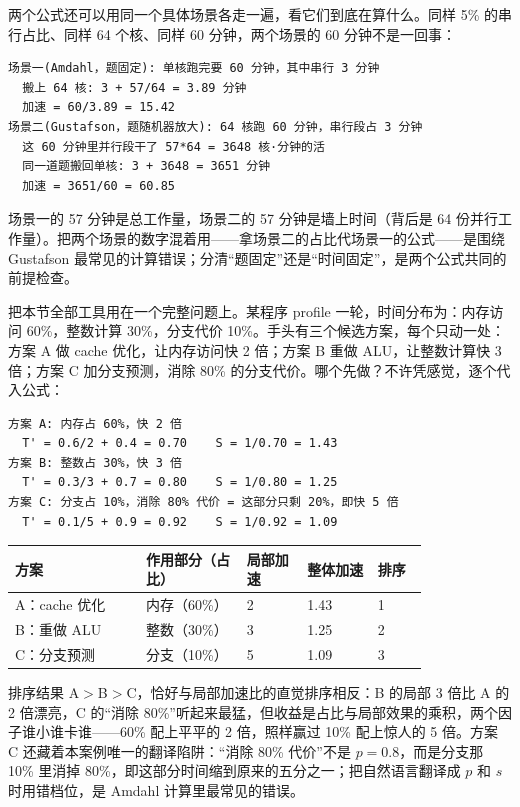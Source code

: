 两个公式还可以用同一个具体场景各走一遍，看它们到底在算什么。同样 5\% 的串行占比、同样 64 个核、同样 60 分钟，两个场景的 60 分钟不是一回事：

\begin{lstlisting}
场景一(Amdahl，题固定): 单核跑完要 60 分钟，其中串行 3 分钟
  搬上 64 核: 3 + 57/64 = 3.89 分钟
  加速 = 60/3.89 = 15.42
场景二(Gustafson，题随机器放大): 64 核跑 60 分钟，串行段占 3 分钟
  这 60 分钟里并行段干了 57*64 = 3648 核·分钟的活
  同一道题搬回单核: 3 + 3648 = 3651 分钟
  加速 = 3651/60 = 60.85
\end{lstlisting}

场景一的 57 分钟是总工作量，场景二的 57 分钟是墙上时间（背后是 64 份并行工作量）。把两个场景的数字混着用——拿场景二的占比代场景一的公式——是围绕 Gustafson 最常见的计算错误；分清“题固定”还是“时间固定”，是两个公式共同的前提检查。

把本节全部工具用在一个完整问题上。某程序 profile 一轮，时间分布为：内存访问 60\%，整数计算 30\%，分支代价 10\%。手头有三个候选方案，每个只动一处：方案 A 做 cache 优化，让内存访问快 2 倍；方案 B 重做 ALU，让整数计算快 3 倍；方案 C 加分支预测，消除 80\% 的分支代价。哪个先做？不许凭感觉，逐个代入公式：

\begin{lstlisting}
方案 A: 内存占 60%，快 2 倍
  T' = 0.6/2 + 0.4 = 0.70    S = 1/0.70 = 1.43
方案 B: 整数占 30%，快 3 倍
  T' = 0.3/3 + 0.7 = 0.80    S = 1/0.80 = 1.25
方案 C: 分支占 10%，消除 80% 代价 = 这部分只剩 20%，即快 5 倍
  T' = 0.1/5 + 0.9 = 0.92    S = 1/0.92 = 1.09
\end{lstlisting}

\begin{longtable}{L{0.26\linewidth}L{0.20\linewidth}L{0.12\linewidth}L{0.14\linewidth}L{0.10\linewidth}}
\toprule
方案 & 作用部分（占比） & 局部加速 & 整体加速 & 排序 \\
\midrule
A：cache 优化 & 内存（60\%） & 2 & 1.43 & 1 \\\tablerowrule
B：重做 ALU & 整数（30\%） & 3 & 1.25 & 2 \\\tablerowrule
C：分支预测 & 分支（10\%） & 5 & 1.09 & 3 \\
\bottomrule
\end{longtable}

排序结果 A$>$B$>$C，恰好与局部加速比的直觉排序相反：B 的局部 3 倍比 A 的 2 倍漂亮，C 的“消除 80\%”听起来最猛，但收益是占比与局部效果的乘积，两个因子谁小谁卡谁——60\% 配上平平的 2 倍，照样赢过 10\% 配上惊人的 5 倍。方案 C 还藏着本案例唯一的翻译陷阱：“消除 80\% 代价”不是 $p=0.8$，而是分支那 10\% 里消掉 80\%，即这部分时间缩到原来的五分之一；把自然语言翻译成 $p$ 和 $s$ 时用错档位，是 Amdahl 计算里最常见的错误。


